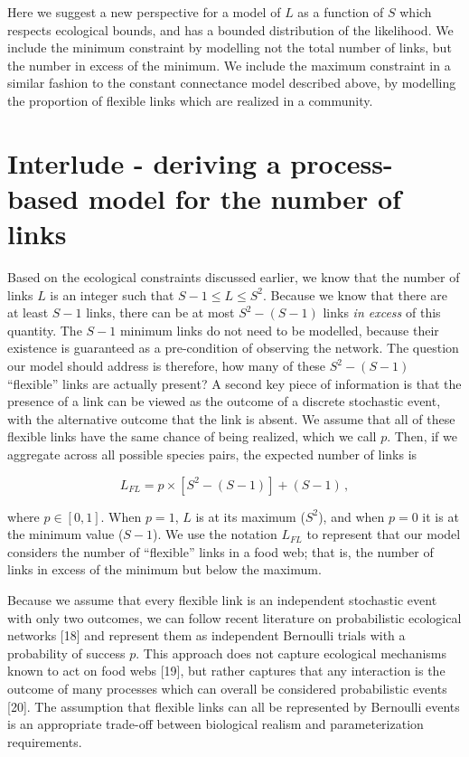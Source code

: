 \documentclass[12pt]{article}
\begin{document}
Here we suggest a new perspective for a model of \(L\) as a function of
\(S\) which respects ecological bounds, and has a bounded distribution
of the likelihood. We include the minimum constraint by modelling not
the total number of links, but the number in excess of the minimum. We
include the maximum constraint in a similar fashion to the constant
connectance model described above, by modelling the proportion of
flexible links which are realized in a community.

\hypertarget{interlude---deriving-a-process-based-model-for-the-number-of-links}{%
\section{Interlude - deriving a process-based model for the number of
links}\label{interlude---deriving-a-process-based-model-for-the-number-of-links}}

Based on the ecological constraints discussed earlier, we know that the
number of links \(L\) is an integer such that \(S-1 \le L \le S^2\).
Because we know that there are at least \(S-1\) links, there can be at
most \(S^2-(S-1)\) links \emph{in excess} of this quantity. The \(S-1\)
minimum links do not need to be modelled, because their existence is
guaranteed as a pre-condition of observing the network. The question our
model should address is therefore, how many of these \(S^2-(S-1)\)
``flexible'' links are actually present? A second key piece of
information is that the presence of a link can be viewed as the outcome
of a discrete stochastic event, with the alternative outcome that the
link is absent. We assume that all of these flexible links have the same
chance of being realized, which we call \(p\). Then, if we aggregate
across all possible species pairs, the expected number of links is

\begin{equation} L_{FL} = p\times\left[S^2-(S-1)\right]+(S-1)\,, \label{eq:lhat}\end{equation}

where \(p \in [0,1]\). When \(p = 1\), \(L\) is at its maximum
(\(S^2\)), and when \(p = 0\) it is at the minimum value (\(S - 1\)). We
use the notation \(L_{FL}\) to represent that our model considers the
number of ``flexible'' links in a food web; that is, the number of links
in excess of the minimum but below the maximum.

Because we assume that every flexible link is an independent stochastic
event with only two outcomes, we can follow recent literature on
probabilistic ecological networks {[}18{]} and represent them as
independent Bernoulli trials with a probability of success \(p\). This
approach does not capture ecological mechanisms known to act on food
webs {[}19{]}, but rather captures that any interaction is the outcome
of many processes which can overall be considered probabilistic events
{[}20{]}. The assumption that flexible links can all be represented by
Bernoulli events is an appropriate trade-off between biological realism
and parameterization requirements.
\end{document}
